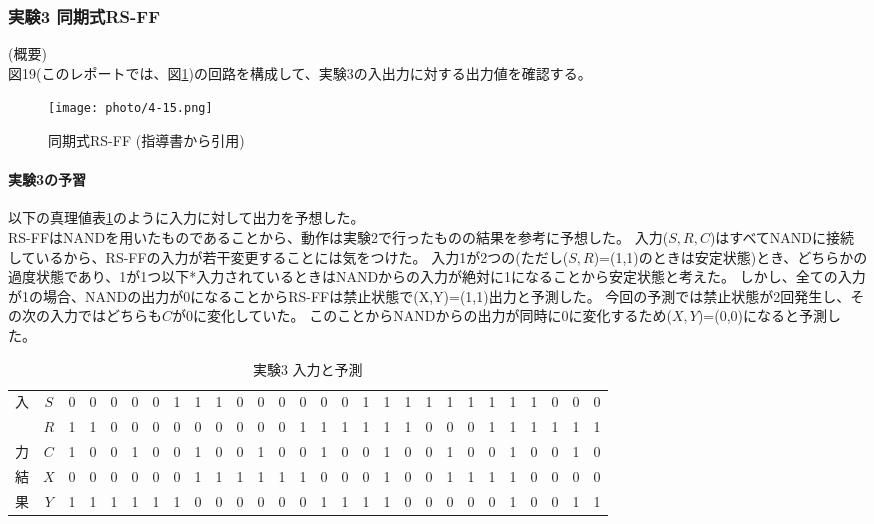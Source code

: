 \documentclass[dvipdfmx]{jsarticle}
\begin{document}
\subsubsection{実験3 同期式RS-FF} \label{4.6.3}
(概要)\\
図19(このレポートでは、図\ref{fig:4-15})の回路を構成して、実験3の入出力に対する出力値を確認する。

\begin{figure}[hbtp]
  \begin{center}
    \texttt{[image: photo/4-15.png]}
  \end{center}
  \caption{同期式RS-FF (指導書\cite[p.3-14]{degital}から引用)}
  \label{fig:4-15}
\end{figure}
\paragraph{実験3の予習}
\label{yosoku1}
以下の真理値表\ref{tb:4-9}のように入力に対して出力を予想した。\\

RS-FFはNANDを用いたものであることから、動作は実験2で行ったものの結果を参考に予想した。
入力($S,R,C$)はすべてNANDに接続しているから、RS-FFの入力が若干変更することには気をつけた。
入力1が2つの(ただし($S,R$)=(1,1)のときは安定状態)とき、どちらかの過度状態であり、1が1つ以下*入力されているときはNANDからの入力が絶対に1になることから安定状態と考えた。
しかし、全ての入力が1の場合、NANDの出力が0になることからRS-FFは禁止状態で(X,Y)=(1,1)出力と予測した。
今回の予測では禁止状態が2回発生し、その次の入力ではどちらも$C$が0に変化していた。
このことからNANDからの出力が同時に0に変化するため($X,Y$)=(0,0)になると予測した。

\begin{table}[hbtp]
  \caption{実験3 入力と予測}
  \centering
  \begin{tabular}{|c|c|c|c|c|c|c|c|c|c|c|c|c|c|c|c|c|c|c|c|c|c|c|c|c|c|c|c|} \hline
    入 & $S$ & 0 & 0 & 0 & 0 & 0 & 1 & 1 & 1 & 0 & 0 & 0 & 0 & 0 & 0 & 1 & 1 & 1 & 1 & 1 & 1 & 1 & 1 & 1 & 0 & 0 & 0 \\ 
       & $R$ & 1 & 1 & 0 & 0 & 0 & 0 & 0 & 0 & 0 & 0 & 0 & 1 & 1 & 1 & 1 & 1 & 1 & 0 & 0 & 0 & 1 & 1 & 1 & 1 & 1 & 1 \\ 
    力 & $C$ & 1 & 0 & 0 & 1 & 0 & 0 & 1 & 0 & 0 & 1 & 0 & 0 & 1 & 0 & 0 & 1 & 0 & 0 & 1 & 0 & 0 & 1 & 0 & 0 & 1 & 0 \\ \hline\hline
    結 & $X$ & 0 & 0 & 0 & 0 & 0 & 0 & 1 & 1 & 1 & 1 & 1 & 1 & 0 & 0 & 0 & 1 & 0 & 0 & 1 & 1 & 1 & 1 & 0 & 0 & 0 & 0\\ 
    果 & $Y$ & 1 & 1 & 1 & 1 & 1 & 1 & 0 & 0 & 0 & 0 & 0 & 0 & 1 & 1 & 1 & 1 & 0 & 0 & 0 & 0 & 0 & 1 & 0 & 0 & 1 & 1\\ \hline
  \end{tabular}
  \label{tb:4-9}
\end{table}
\end{document}
